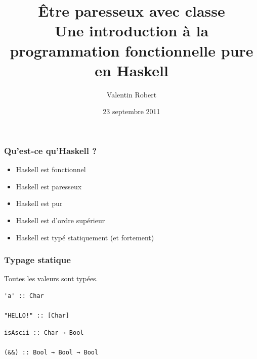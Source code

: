 \documentclass[10pt]{beamer}
\title[Haskell]{Être paresseux avec classe\\
Une introduction à la programmation fonctionnelle pure en Haskell}
\author{Valentin Robert}
\institute{ENSEIRB / UCSD / INRIA}
\date{23 septembre 2011}
\begin{document}
\begin{frame}
\titlepage
\end{frame}



\begin{frame}
\frametitle{Qu'est-ce qu'Haskell ?}

\begin{itemize}

\item Haskell est fonctionnel

\pause

\item Haskell est paresseux

\pause

\item Haskell est pur

\pause

\item Haskell est d'ordre supérieur

\pause

\item Haskell est typé statiquement (et fortement)

\end{itemize}

\end{frame}



\begin{frame}[fragile]
\frametitle{Typage statique}

Toutes les valeurs sont typées.

\begin{verbatim}
'a' :: Char

"HELLO!" :: [Char]
\end{verbatim}

\pause

\begin{verbatim}
isAscii :: Char → Bool

(&&) :: Bool → Bool → Bool
\end{verbatim}
\end{frame}
\end{document}

